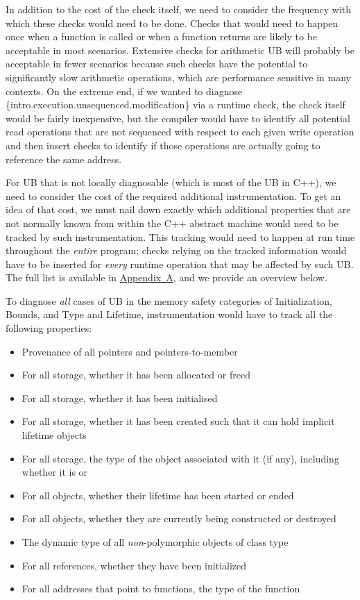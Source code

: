 In addition to the cost of the check itself, we need to consider the frequency with which these checks would need to be done. Checks that would need to happen once when a function is called or when a function returns are likely to be acceptable in most scenarios. Extensive checks for arithmetic UB will probably be acceptable in fewer scenarios because such checks have the potential to significantly slow arithmetic operations, which are performance sensitive in many contexts. On the extreme end, if we wanted to diagnose \{intro.execution.unsequenced.modification\} via a runtime check, the check itself would be fairly inexpensive, but the compiler would have to identify all potential read operations that are not sequenced with respect to each given write operation and then insert checks to identify if those operations are actually going to reference the same address.

For UB that is not locally diagnosable (which is most of the UB in C++), we need to consider the cost of the required additional instrumentation. To get an idea of that cost, we must nail down exactly which additional properties that are not normally known from within the C++ abstract machine would need to be tracked by such instrumentation. This tracking would need to happen at run time throughout the \emph{entire} program; checks relying on the tracked information would have to be inserted for \emph{every} runtime operation that may be affected by such UB.
The full list is available in \hyperref[appendix]{Appendix~A}, and we provide an overview below.

To diagnose \emph{all} cases of UB in the memory safety categories of Initialization, Bounds, and Type and Lifetime, instrumentation would have to track all the following properties:

\begin{itemize}
\item Provenance of all pointers and pointers-to-member
\item For all storage, whether it has been allocated or freed
\item For all storage, whether it has been initialised
\item For all storage, whether it has been created such that it can hold implicit lifetime objects
\item For all storage, the type of the object associated with it (if any), including whether it is  or 
\item For all objects, whether their lifetime has been started or ended
\item For all objects, whether they are currently being constructed or destroyed
\item The dynamic type of all \emph{non}-polymorphic objects of class type
\item For all references, whether they have been initialized
\item For all addresses that point to  functions, the type of the function
\end{itemize}

